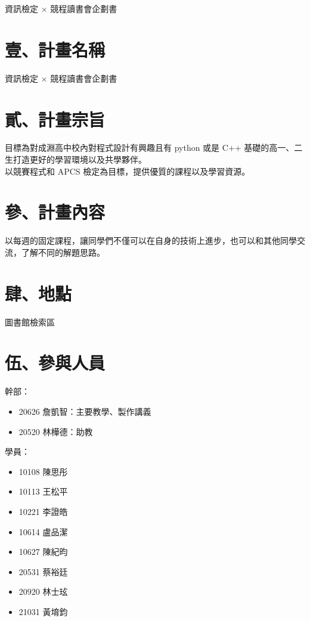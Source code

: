\documentclass[12pt]{article}
\begin{document}
    \begin{Huge}
        \begin{center}
            資訊檢定 × 競程讀書會企劃書
        \end{center}
    \end{Huge}

    \section*{壹、計畫名稱}
    資訊檢定 × 競程讀書會企劃書

    \section*{貳、計畫宗旨}
    目標為對成淵高中校內對程式設計有興趣且有 python 或是 C++ 基礎的高一、二生打造更好的學習環境以及共學夥伴。\\以競賽程式和 APCS 檢定為目標，提供優質的課程以及學習資源。

    \section*{參、計畫內容}
    以每週的固定課程，讓同學們不僅可以在自身的技術上進步，也可以和其他同學交流，了解不同的解題思路。

    \section*{肆、地點}
    圖書館檢索區

    \section*{伍、參與人員}
    幹部：
    \begin{itemize}
        \item 20626 詹凱智：主要教學、製作講義
        \item 20520 林樺德：助教
    \end{itemize}

    \pagebreak

    \noindent
    學員：
    \begin{itemize}
        \item 10108 陳思彤
        \item 10113 王松平
        \item 10221 李證皓
        \item 10614 盧品潔
        \item 10627 陳紀昀
        \item 20531 蔡裕廷
        \item 20920 林士玹
        \item 21031 黃堉鈞
    \end{itemize}
\end{document}
